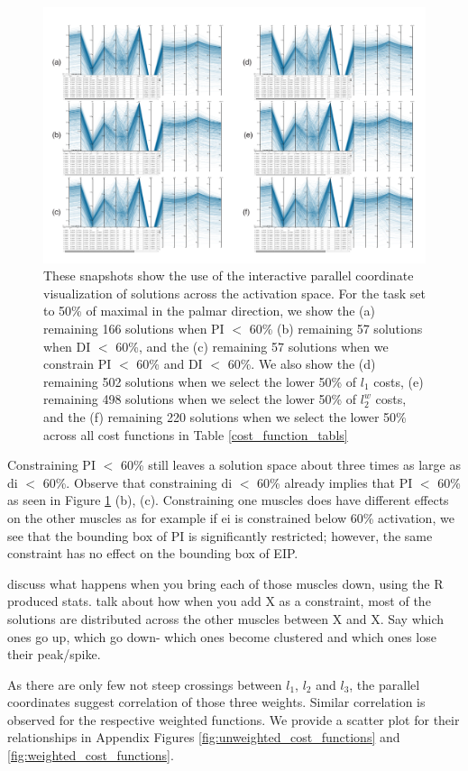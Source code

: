 \begin{figure}[htbp]
\centering
\includegraphics[width=\textwidth]{figs/parcoords.pdf}
\caption{These snapshots show the use of the interactive parallel coordinate visualization of solutions across the activation space. For the task set to 50\% of maximal in the palmar direction, we show the
(a) remaining 166 solutions when PI $<$ 60\% 
(b) remaining 57 solutions when DI $<$ 60\%, and the
(c) remaining 57 solutions when we constrain PI $<$ 60\% and DI $<$ 60\%. We also show the
(d) remaining 502 solutions when we select the lower 50\% of $l_1$ costs,
(e) remaining 498 solutions when we select the lower 50\% of $l_2^w$ costs, and the
(f) remaining 220 solutions when we select the lower 50\% across all cost functions in Table \ref{cost_function_tabls} }
\label{fig:parcoords}
\end{figure}

Constraining PI $<$ 60\% still leaves a solution space about three times as large as di $<$ 60\%. 
Observe that constraining di $<$ 60\% already implies that PI $<$ 60\% as seen in Figure \ref{fig:parcoords} (b), (c). 
Constraining one muscles does have different effects on the other muscles as for example if ei is constrained below 60\% activation, we see that the bounding box of PI is significantly restricted; however, the same constraint has no effect on the bounding box of EIP.

discuss what happens when you bring each of those muscles down, using the R produced stats.
talk about how when you add X as a constraint, most of the solutions are distributed across the other muscles between X and X. Say which ones go up, which go down- which ones become clustered and which ones lose their peak/spike.

As there are only few not steep crossings between $l_1$, $l_2$ and $l_3$, the parallel coordinates suggest correlation of those three weights. Similar correlation is observed for the respective weighted functions. %
We provide a scatter plot for their relationships in Appendix Figures \ref{fig:unweighted_cost_functions} and \ref{fig:weighted_cost_functions}.

